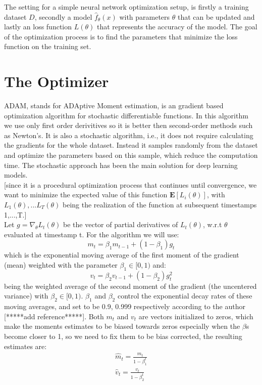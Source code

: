 \documentclass[10pt,a4paper]{article}
\begin{document}
The setting for a simple neural network optimization setup, is firstly a training dataset $D$, secondly a model $\hat{f}_{\theta}(x)$ with parameters $\theta$ that can be updated and lastly an loss function $L(\theta)$ that represents the accuracy of the model.
The goal of the optimization process is to find the parameters that minimize the loss function on the training set.\\





\section*{The Optimizer}

ADAM, stands for ADAptive Moment estimation, is an gradient based optimization algorithm for stochastic differentiable functions. In this algorithm we use only first order derivitives so it is better then second-order methods such as Newton's.
It is also a stochastic algorithm, i.e., it does not require calculating the gradients for the whole dataset. Instead it samples randomly from the dataset and optimize the parameters based on this sample, which reduce the computation time.
The stochastic approach has been the main solution for deep learning models.\\


[since it is a procedural optimization process that continues until convergence, we want to minimize the expected value of this function $\mathbf{E}[L_i(\theta)]$, with $L_1(\theta), ...L_T(\theta)$ being the realization of the function at subsequent timestamps 1,...,T.]\\ 


Let $g=\nabla_\theta L_t(\theta)$ be the vector of partial derivatives of $L_t(\theta)$, w.r.t $\theta$ evaluated at timestamp t. For the algorithm we will use: 
\begin{equation*}
    m_t=\beta_1m_{t-1}+(1-\beta_1)g_t
\end{equation*}
which is the exponential moving average of the first moment of the gradient (mean) weighted with the parameter $\beta_1\in[0,1)$ and: 
\begin{equation*}
    v_t=\beta_2v_{t-1}+(1-\beta_2)g^2_t
\end{equation*}
being the weighted average of the second moment of the gradient (the uncentered variance) with $\beta_2\in[0,1)$. $\beta_1$ and $\beta_2$ control the exponential decay rates of these moving averages, and set to be 0.9, 0.999 respectively according to the author [*****add reference*****].
Both $m_t$ and $v_t$ are vectors initialized to zeros, which make the moments estimates to be biased towards zeros especially when the $\beta$s become closer to 1, so we need to fix them to be bias corrected, the resulting estimates are: 
\begin{equation*}
    \begin{split}
    \hat{m}_t=\frac{m_t}{1-\beta_1^t} \\ 
    \hat{v}_t=\frac{v_t}{1-\beta_2^t}
    \end{split}
\end{equation*}
\end{document}
